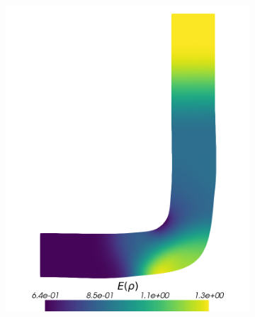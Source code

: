 \begin{figure}[H]
	\centering
	\begin{subfigure}{0.3\linewidth}
		\centering
		\includegraphics[scale=0.18]{figs/pipe/pipe_sc_ref_n50_E(rho).png}
		\caption{}
		\label{fig:referenceSolutionsPipe1}
	\end{subfigure}%
	\hfill
	\begin{subfigure}{0.3\linewidth}
		\centering

\end{subfigure}
\end{figure}
